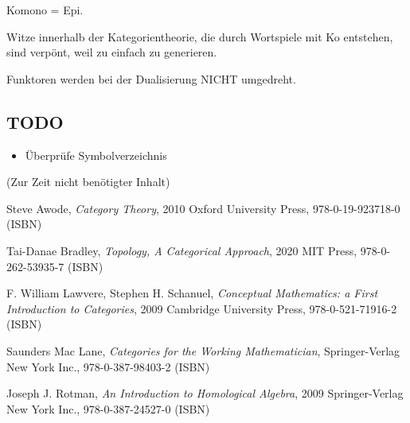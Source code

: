 \documentclass[a4paper]{amsart}
\theoremstyle{definition}
\begin{document}
Komono = Epi.

Witze innerhalb der Kategorientheorie, die durch Wortspiele mit Ko entstehen, sind verpönt, weil zu einfach zu generieren.

Funktoren werden bei der Dualisierung NICHT umgedreht.


\begin{backup}
\section{TODO}
\begin{itemize}
     \item Überprüfe Symbolverzeichnis
\end{itemize}

\end{backup}

\begin{backup}
    (Zur Zeit nicht benötigter Inhalt)
\end{backup}

\begin{thebibliography}{9}
      Steve Awode, \emph{Category Theory},
      2010 Oxford University Press, 978-0-19-923718-0 (ISBN)

      Tai-Danae Bradley, \emph{Topology, A Categorical Approach},
      2020 MIT Press, 978-0-262-53935-7 (ISBN)

      F. William Lawvere, Stephen H. Schanuel, \emph{Conceptual Mathematics: a First Introduction to Categories},
      2009 Cambridge University Press, 978-0-521-71916-2 (ISBN)

      Saunders Mac Lane, \emph{Categories for the Working Mathematician},
      Springer-Verlag New York Inc., 978-0-387-98403-2 (ISBN)

   	Joseph J. Rotman, \emph{An Introduction to Homological Algebra},
   	2009 Springer-Verlag New York Inc., 978-0-387-24527-0 (ISBN)

\end{thebibliography}
\end{document}
